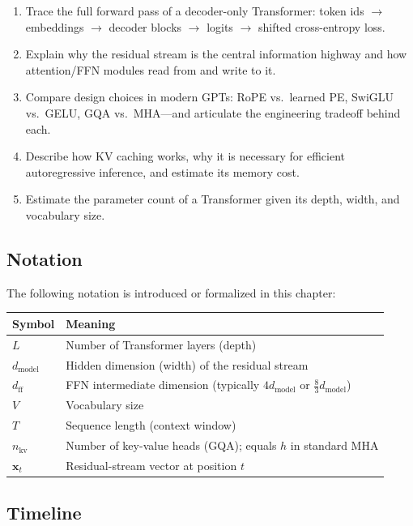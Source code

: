 \begin{enumerate}
  \item Trace the full forward pass of a decoder-only Transformer: token ids $\to$ embeddings $\to$ decoder blocks $\to$ logits $\to$ shifted cross-entropy loss.
  \item Explain why the residual stream is the central information highway and how attention/FFN modules read from and write to it.
  \item Compare design choices in modern GPTs: RoPE vs.\ learned PE, SwiGLU vs.\ GELU, GQA vs.\ MHA---and articulate the engineering tradeoff behind each.
  \item Describe how KV caching works, why it is necessary for efficient autoregressive inference, and estimate its memory cost.
  \item Estimate the parameter count of a Transformer given its depth, width, and vocabulary size.
\end{enumerate}

\subsection*{Notation}

The following notation is introduced or formalized in this chapter:

\begin{center}
\begin{tabular}{ll}
\toprule
Symbol & Meaning \\
\midrule
$L$ & Number of Transformer layers (depth) \\
$d_{\text{model}}$ & Hidden dimension (width) of the residual stream \\
$d_{\text{ff}}$ & FFN intermediate dimension (typically $4 d_{\text{model}}$ or $\frac{8}{3} d_{\text{model}}$) \\
$V$ & Vocabulary size \\
$T$ & Sequence length (context window) \\
$n_{\text{kv}}$ & Number of key-value heads (GQA); equals $h$ in standard MHA \\
$\mathbf{x}_t$ & Residual-stream vector at position $t$ \\
\bottomrule
\end{tabular}
\end{center}

\subsection*{Timeline}

